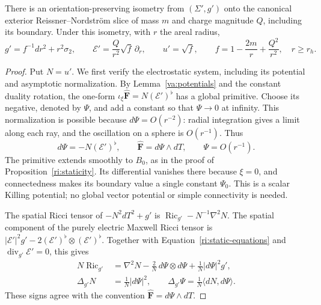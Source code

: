 \begin{proposition}
\label{ri:rn-identification}
There is an orientation-preserving isometry from $(\Sigma',g')$
onto the canonical exterior Reissner--Nordstr\"om slice of mass $m$
and charge magnitude $Q$, including its boundary.  Under this
isometry, with $r$ the areal radius,
\begin{equation}
\label{ri:rn-static-data}
 g'=f^{-1}dr^2+r^2\sigma_2,\qquad
 \mathcal E'=\frac Q{r^2}\sqrt f\,\partial_r,\qquad
 u'=\sqrt f,\qquad
 f=1-\frac{2m}{r}+\frac{Q^2}{r^2},\quad r\geq r_h.
\end{equation}
\end{proposition}

\begin{proof}
Put $N=u'$.  We first verify the electrostatic system, including its
potential and asymptotic normalization.  By Lemma~\ref{va:potentials}
and the constant duality rotation, the one-form
$\iota_\xi\widehat{\mathbf F}=N(\mathcal E')^\flat$ has a global
primitive.  Choose its negative, denoted by $\Psi$, and add a
constant so that $\Psi\to0$ at infinity.  This normalization is
possible because $d\Psi=O(r^{-2})$: radial integration gives a
limit along each ray, and the oscillation on a sphere is $O(r^{-1})$.
Thus
\[
 d\Psi=-N(\mathcal E')^\flat,\qquad
 \widehat{\mathbf F}=d\Psi\wedge dT,\qquad \Psi=O(r^{-1}).
\]
The primitive extends smoothly to $B_0$, as in the proof of
Proposition~\ref{ri:staticity}.  Its differential vanishes there
because $\xi=0$, and connectedness makes its boundary value a
single constant $\Psi_0$.  This is a scalar Killing potential;
no global vector potential or simple connectivity is needed.

The spatial Ricci tensor of $-N^2dT^2+g'$ is
$\operatorname{Ric}_{g'}-N^{-1}\nabla^2N$.  The spatial component
of the purely electric Maxwell Ricci tensor is
$|\mathcal E'|^2g'-2(\mathcal E')^\flat\otimes(\mathcal E')^\flat$.
Together with Equation~\eqref{ri:static-equations} and
$\operatorname{div}_{g'}\mathcal E'=0$, this gives
\[
 \begin{aligned}
 N\operatorname{Ric}_{g'}
   &=\nabla^2N-\frac2N\,d\Psi\otimes d\Psi
                        +\frac1N|d\Psi|^2g',\\
 \Delta_{g'}N&=\frac1N|d\Psi|^2,\qquad
 \Delta_{g'}\Psi=\frac1N\langle dN,d\Psi\rangle.
 \end{aligned}
\]
These signs agree with the convention
$\widehat{\mathbf F}=d\Psi\wedge dT$.


\end{proof}
